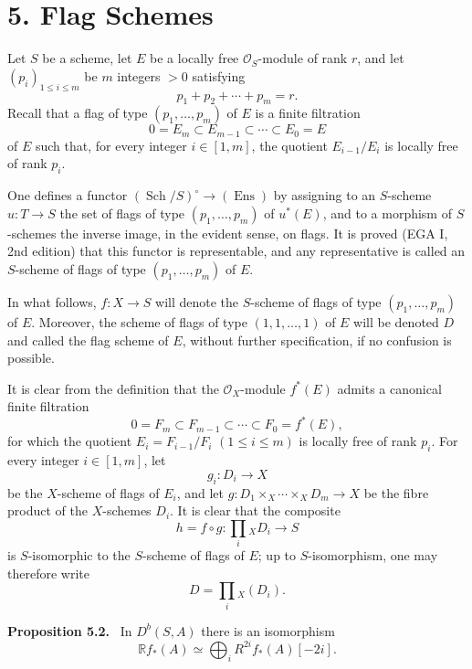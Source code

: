 \documentclass[11pt]{article}
\newenvironment{statement}[1]{\par\medskip\noindent\textbf{#1.}\ }{\par\medskip}
\begin{document}
\section*{5. Flag Schemes}

Let $S$ be a scheme, let $E$ be a locally free $\mathcal O_S$-module of rank $r$, and let $(p_i)_{1\le i\le m}$ be $m$ integers $>0$ satisfying
\[
p_1+p_2+\cdots+p_m=r.
\]
Recall that a flag of type $(p_1,\ldots,p_m)$ of $E$ is a finite filtration
\[
0=E_m\subset E_{m-1}\subset\cdots\subset E_0=E
\]
of $E$ such that, for every integer $i\in[1,m]$, the quotient $E_{i-1}/E_i$ is locally free of rank $p_i$.

One defines a functor $(\operatorname{Sch}/S)^\circ\to(\operatorname{Ens})$ by assigning to an $S$-scheme $u:T\to S$ the set of flags of type $(p_1,\ldots,p_m)$ of $u^*(E)$, and to a morphism of $S$-schemes the inverse image, in the evident sense, on flags. It is proved (EGA I, 2nd edition) that this functor is representable, and any representative is called an $S$-scheme of flags of type $(p_1,\ldots,p_m)$ of $E$.

In what follows, $f:X\to S$ will denote the $S$-scheme of flags of type $(p_1,\ldots,p_m)$ of $E$. Moreover, the scheme of flags of type $(1,1,\ldots,1)$ of $E$ will be denoted $D$ and called the flag scheme of $E$, without further specification, if no confusion is possible.

It is clear from the definition that the $\mathcal O_X$-module $f^*(E)$ admits a canonical finite filtration
\[
0=F_m\subset F_{m-1}\subset\cdots\subset F_0=f^*(E),
\]
for which the quotient $E_i=F_{i-1}/F_i$ $(1\le i\le m)$ is locally free of rank $p_i$. For every integer $i\in[1,m]$, let
\[
g_i:D_i\to X
\]
be the $X$-scheme of flags of $E_i$, and let $g:D_1\times_X\cdots\times_X D_m\to X$ be the fibre product of the $X$-schemes $D_i$. It is clear that the composite
\[
h=f\circ g:\prod_i{}_XD_i\to S
\tag{5.1}
\]
is $S$-isomorphic to the $S$-scheme of flags of $E$; up to $S$-isomorphism, one may therefore write
\[
D=\prod_i{}_X(D_i).
\]

\begin{statement}{Proposition 5.2}
In $D^b(S,A)$ there is an isomorphism
\[
\mathbb{R}f_*(A)\simeq\bigoplus_i R^{2i}f_*(A)[-2i].
\]
\end{statement}
\end{document}
